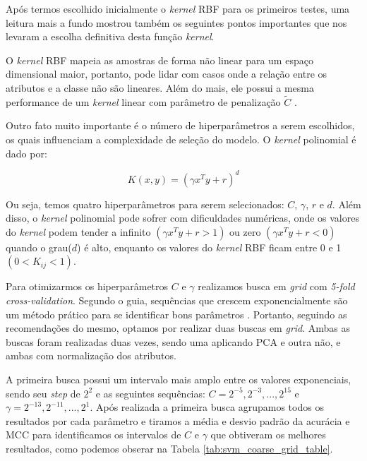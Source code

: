 Após termos escolhido inicialmente o \emph{kernel} RBF para os primeiros testes, uma leitura mais a fundo mostrou também os seguintes pontos importantes que nos levaram a escolha definitiva desta função \emph{kernel}.

O \emph{kernel} RBF mapeia as amostras de forma não linear para um espaço dimensional maior, portanto, pode lidar com casos onde a relação entre os atributos e a classe não são lineares. Além do mais, ele possui a mesma performance de um \emph{kernel} linear com parâmetro de penalização $\tilde{C}$  \cite{rbf_linear}.

Outro fato muito importante é o número de hiperparâmetros a serem escolhidos, os quais influenciam a complexidade de seleção do modelo. O \emph{kernel} polinomial é dado por:

\begin{equation}
	K(x, y) = (\gamma x^T y + r)^d
\end{equation}

Ou seja, temos quatro hiperparâmetros para serem selecionados: $C$, $\gamma$, $r$ e $d$. Além disso, o \emph{kernel} polinomial pode sofrer com dificuldades numéricas, onde os valores do \emph{kernel} podem tender a infinito $(\gamma x^T y + r > 1)$ ou zero $(\gamma x^T y + r < 0)$ quando o grau($d$) é alto, enquanto os valores do \emph{kernel} RBF ficam entre 0 e 1 $(0 < K_{ij} < 1)$.

Para otimizarmos os hiperparâmetros $C$ e $\gamma$ realizamos busca em \emph{grid} com \emph{5-fold cross-validation}. Segundo o guia, sequências que crescem exponencialmente são um método prático para se identificar bons parâmetros \cite{libsvm_guide}. Portanto, seguindo as recomendações do mesmo, optamos por realizar duas buscas em \emph{grid}. Ambas as buscas foram realizadas duas vezes, sendo uma aplicando PCA e outra não, e ambas com normalização dos atributos.

A primeira busca possui um intervalo mais amplo entre os valores exponenciais, sendo seu \emph{step} de $2^2$ e as seguintes sequências: $C = 2^{-5}, 2^{-3}, ..., 2^{15}$ e $\gamma = 2^{-13}, 2^{-11}, ..., 2^1$. Após realizada a primeira busca agrupamos todos os resultados por cada parâmetro e tiramos a média e desvio padrão da acurácia e MCC para identificamos os intervalos de $C$ e $\gamma$ que obtiveram os melhores resultados, como podemos obserar na Tabela \ref{tab:svm_coarse_grid_table}.


